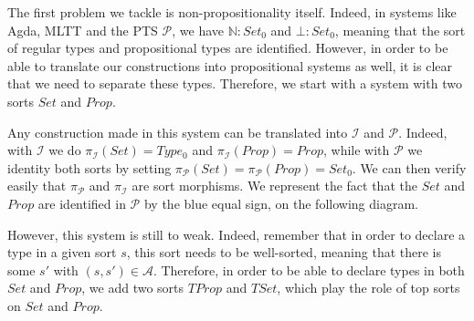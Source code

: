 \documentclass[]{template}
\begin{document}

The first problem we tackle is non-propositionality itself. Indeed, in systems like Agda, MLTT and the PTS $ \mathcal{P} $, we have $ \mathbb{N} : Set_0 $ and $ \bot : Set_0 $, meaning that the sort of regular types and propositional types are identified. However, in order to be able to translate our constructions into propositional systems as well, it is clear that we need to separate these types. Therefore, we start with a system with two sorts $ Set $ and $ Prop $.
\begin{center}
\end{center}
Any construction made in this system can be translated into $ \mathcal{I} $ and $ \mathcal{P} $. Indeed, with $ \mathcal{I} $ we do $ \pi_\mathcal{I}(Set)=Type_0 $ and $ \pi_\mathcal{I}(Prop)=Prop $, while with $ \mathcal{P} $ we identity both sorts by setting $ \pi_\mathcal{P}(Set) = \pi_\mathcal{P}(Prop)=Set_0 $. We can then verify easily that $ \pi_\mathcal{P} $ and $ \pi_\mathcal{I} $ are sort morphisms. We represent the fact that the $ Set $ and $ Prop $ are identified in $ \mathcal{P} $ by the blue equal sign, on the following diagram.

\begin{center}
\end{center}


However, this system is still to weak. Indeed, remember that in order to declare a type in a given sort $ s $, this sort needs to be well-sorted, meaning that there is some $ s' $ with $ (s,s')\in \mathcal{A} $. Therefore, in order to be able to declare types in both $ Set $ and $ Prop $, we add two sorts $ TProp $ and $ TSet $, which play the role of top sorts on $ Set $ and $ Prop $.

\begin{center}
\end{center}
\end{document}
